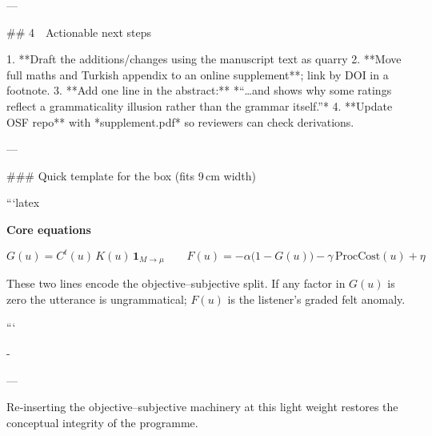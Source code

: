---

## 4 Actionable next steps

1. **Draft the additions/changes using the manuscript text as quarry
2. **Move full maths and Turkish appendix to an online supplement**; link by DOI in a footnote.
3. **Add one line in the abstract:** *“…and shows why some ratings reflect a grammaticality illusion rather than the grammar itself.”*
4. **Update OSF repo** with *supplement.pdf* so reviewers can check derivations.

---

### Quick template for the box (fits 9 cm width)

```latex
\begin{tcolorbox}[colback=lsLightBlue!30]
\textbf{Core equations}

\vspace{-0.5\baselineskip}
\[
G(u)=C^{t}(u)\,K(u)\,\mathbf{1}_{\!M\to\mu}
\qquad
F(u)=-\alpha\bigl(1-G(u)\bigr)-\gamma\,\text{ProcCost}(u)+\eta
\]

\small These two lines encode the objective–subjective split.
If any factor in \(G(u)\) is zero the utterance is ungrammatical;
\(F(u)\) is the listener’s graded felt anomaly.
\end{tcolorbox}
```

-

---

Re‑inserting the objective–subjective machinery at this light weight restores the conceptual integrity of the programme.
